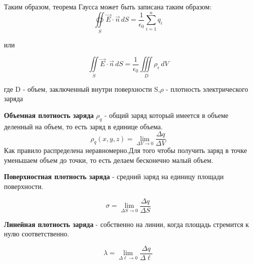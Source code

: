 \documentclass[../main.tex]{subfiles}
\begin{document}
Таким образом, теорема Гаусса может быть записана таким образом:
\[ \oiint\limits_S \vec E \cdot \vec n \,  dS = \frac{1}{\epsilon_0} \sum_{i=1}^{n} q_i\]
\begin{center}
    или
\end{center}
\[\iint \limits_S \vec E \cdot \vec n \, dS  = \frac{1}{\epsilon_0} \iiint\limits_D \rho_\epsilon \, dV\]
\begin{center}
    где D - объем, заключенный внутри поверхности S,\linebreak $\rho$ - плотность электрического заряда
\end{center}


 \textbf{Объемная плотность заряда} $\rho_q$ - общий заряд который имеется в объеме деленный на объем, то есть заряд в единице объема.
\[ \rho_q(x,y,z) = \lim_{\Delta V \to 0} \frac{\Delta q}{\Delta V}\]
Как правило распределена неравномерно.Для того чтобы получить заряд в точке уменьшаем объем до точки, то есть делаем бесконечно малый объем.

 \textbf{Поверхностная плотность заряда} - средний заряд на единицу площади поверхности.

\[ \sigma = \lim_{\Delta S \to 0} \frac{\Delta q}{\Delta S}\]


 \textbf{Линейная плотность заряда}  - собственно на линии, когда площадь стремится к нулю соответственно.

\[ \lambda = \lim_{\Delta \ell \to 0} \frac{\Delta q}{\Delta \ell}\]
\end{document}
